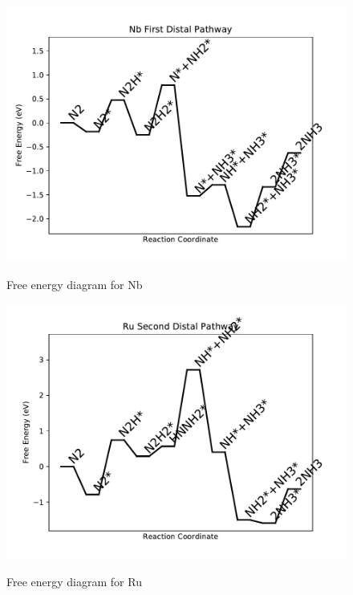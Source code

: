 \documentclass{article}
\begin{document}
\newpage
\begin{figure}
\includegraphics[width=1\linewidth]{data/plots/Nb_distal_1.pdf}
\label{fig:Nb_distal_1}
\caption{Free energy diagram for Nb}
\end{figure}

\begin{figure}
\includegraphics[width=1\linewidth]{data/plots/Ru_distal_2.pdf}
\label{fig:Ru_distal_2}
\caption{Free energy diagram for Ru}
\end{figure}
\end{document}
